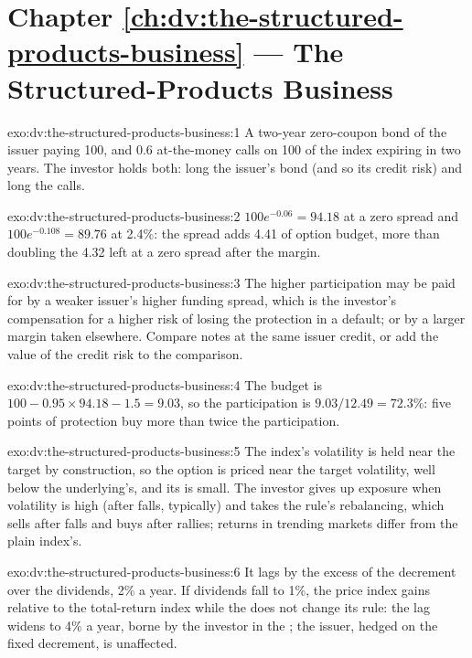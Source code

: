 \section*{Chapter \ref{ch:dv:the-structured-products-business} --- The Structured-Products Business}

\begin{solution}{exo:dv:the-structured-products-business:1}
A two-year zero-coupon bond of the issuer paying 100, and 0.6 at-the-money calls on 100 of the index expiring in two years. The
investor holds both: long the issuer's bond (and so its credit risk) and long the calls.
\end{solution}

\begin{solution}{exo:dv:the-structured-products-business:2}
$100e^{-0.06}=94.18$ at a zero spread and $100e^{-0.108}=89.76$ at 2.4\%: the spread adds 4.41 of option budget, more than doubling
the 4.32 left at a zero spread after the margin.
\end{solution}

\begin{solution}{exo:dv:the-structured-products-business:3}
The higher participation may be paid for by a weaker issuer's higher funding spread, which is the investor's compensation for a higher
risk of losing the protection in a default; or by a larger margin taken elsewhere. Compare notes at the same issuer credit, or add the
value of the credit risk to the comparison.
\end{solution}

\begin{solution}{exo:dv:the-structured-products-business:4}
The budget is $100-0.95\times94.18-1.5=9.03$, so the participation is $9.03/12.49=72.3\%$: five points of protection buy more than
twice the participation.
\end{solution}

\begin{solution}{exo:dv:the-structured-products-business:5}
The index's volatility is held near the target by construction, so the option is priced near the target volatility, well below the
underlying's, and its  is small. The investor gives up exposure when volatility is high (after falls, typically) and takes the
rule's rebalancing, which sells after falls and buys after rallies; returns in trending markets differ from the plain index's.
\end{solution}

\begin{solution}{exo:dv:the-structured-products-business:6}
It lags by the excess of the decrement over the dividends, 2\% a year. If dividends fall to 1\%, the price index gains relative to the
total-return index while the  does not change its rule: the lag widens to 4\% a year, borne by the investor in the ; the issuer, hedged on the fixed decrement, is unaffected.
\end{solution}

